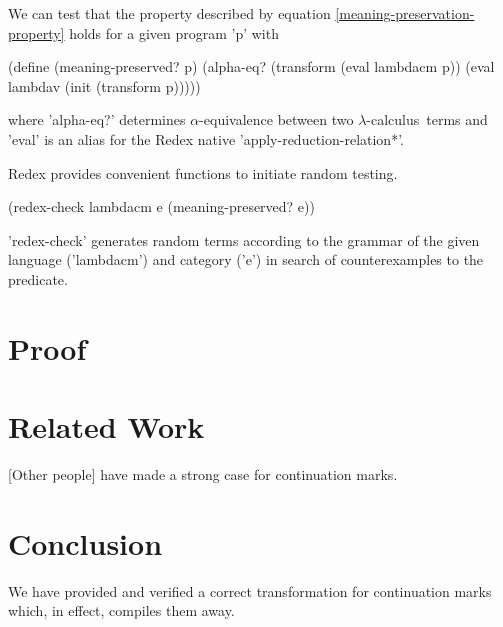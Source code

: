 \documentclass{llncs}
\newcommand{\lc}[0]{$\lambda$-calculus}
\begin{document}
We can test that the property described by equation \ref{meaning-preservation-property} holds for a given program \scheme'p' with 
\begin{schemedisplay}
(define (meaning-preserved? p)
  (alpha-eq? (transform (eval lambdacm p)) (eval lambdav (init (transform p)))))
\end{schemedisplay}
where \scheme'alpha-eq?' determines $\alpha$-equivalence between two \lc\ terms and \scheme'eval' is an alias for the Redex native \scheme'apply-reduction-relation*'.

Redex provides convenient functions to initiate random testing.

\begin{schemedisplay}
(redex-check lambdacm e (meaning-preserved? e))
\end{schemedisplay}

\scheme'redex-check' generates random terms according to the grammar of the given language (\scheme'lambdacm') and category (\scheme'e') in search of counterexamples to the predicate. 

\section{Proof}




\section{Related Work}

[Other people] have made a strong case for continuation marks.

\section{Conclusion}

We have provided and verified a correct transformation for continuation marks which, in effect, compiles them away.



\end{document}
